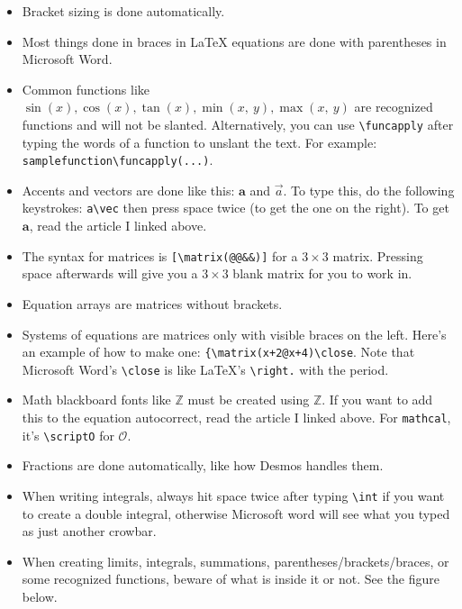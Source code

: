 \documentclass[12pt]{article}
\theoremstyle{plain}
\theoremstyle{remark}
\theoremstyle{definition}
\begin{document}
\begin{itemize}
\item
  Bracket sizing is done automatically.
\item
  Most things done in braces in LaTeX equations are done with
  parentheses in Microsoft Word.
\item
  Common functions like
  \(\sin(x),\cos(x),\tan(x),\min(x,\ y),\max(x,\ y)\) are recognized
  functions and will not be slanted. Alternatively, you can use
  \texttt{\textbackslash{}funcapply} after typing the words of a
  function to unslant the text. For example:
  \texttt{samplefunction\textbackslash{}funcapply(...)}.
\item
  Accents and vectors are done like this: \(\mathbf{a}\) and
  \(\overrightarrow{a}\). To type this, do the following keystrokes:
  \texttt{a\textbackslash{}vec} then press space twice (to get the one
  on the right). To get \(\mathbf{a}\), read the article I linked
  above.
\item
  The syntax for matrices is
  \texttt{{[}\textbackslash{}matrix(@@\&\&){]}} for a \(3 \times 3\)
  matrix. Pressing space afterwards will give you a \(3 \times 3\) blank
  matrix for you to work in.
\item
  Equation arrays are matrices without brackets.
\item
  Systems of equations are matrices only with visible braces on the
  left. Here's an example of how to make one:
  \texttt{\{\textbackslash{}matrix(x+2@x+4)\textbackslash{}close}. Note
  that Microsoft Word's \texttt{\textbackslash{}close} is like LaTeX's
  \texttt{\textbackslash{}right.} with the period.
\item
  Math blackboard fonts like \(\mathbb{Z}\) must be created using
  \(\mathbb{Z}\). If you want to add this to the equation autocorrect,
  read the article I linked above. For \texttt{mathcal}, it's
  \texttt{\textbackslash{}scriptO} for \(\mathcal{O}\).
\item
  Fractions are done automatically, like how Desmos handles them.
\item
  When writing integrals, always hit space twice after typing
  \texttt{\textbackslash{}int} if you want to create a double integral,
  otherwise Microsoft word will see what you typed as just another
  crowbar.
\item
  When creating limits, integrals, summations,
  parentheses/brackets/braces, or some recognized functions, beware of
  what is inside it or not. See the figure below.
\end{itemize}
\end{document}
